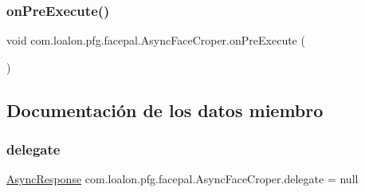 \subsubsection{\texorpdfstring{on\+Pre\+Execute()}{onPreExecute()}}
{\footnotesize\ttfamily void com.\+loalon.\+pfg.\+facepal.\+Async\+Face\+Croper.\+on\+Pre\+Execute (\begin{DoxyParamCaption}{ }\end{DoxyParamCaption})\hspace{0.3cm}{\ttfamily [protected]}}



\subsection{Documentación de los datos miembro}
\mbox{\label{classcom_1_1loalon_1_1pfg_1_1facepal_1_1_async_face_croper_a11ee69c0d77c5662fb576d1a1547ca83}} 
\subsubsection{\texorpdfstring{delegate}{delegate}}
{\footnotesize\ttfamily \mbox{\hyperlink{interfacecom_1_1loalon_1_1pfg_1_1facepal_1_1_async_face_croper_1_1_async_response}{Async\+Response}} com.\+loalon.\+pfg.\+facepal.\+Async\+Face\+Croper.\+delegate = null}

